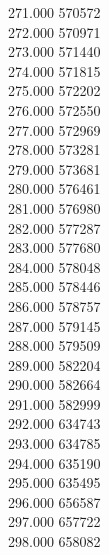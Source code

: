 { 271.000	570572 \\
 272.000	570971 \\
 273.000	571440 \\
 274.000	571815 \\
 275.000	572202 \\
 276.000	572550 \\
 277.000	572969 \\
 278.000	573281 \\
 279.000	573681 \\
 280.000	576461 \\
 281.000	576980 \\
 282.000	577287 \\
 283.000	577680 \\
 284.000	578048 \\
 285.000	578446 \\
 286.000	578757 \\
 287.000	579145 \\
 288.000	579509 \\
 289.000	582204 \\
 290.000	582664 \\
 291.000	582999 \\
 292.000	634743 \\
 293.000	634785 \\
 294.000	635190 \\
 295.000	635495 \\
 296.000	656587 \\
 297.000	657722 \\
 298.000	658082 \\
}
